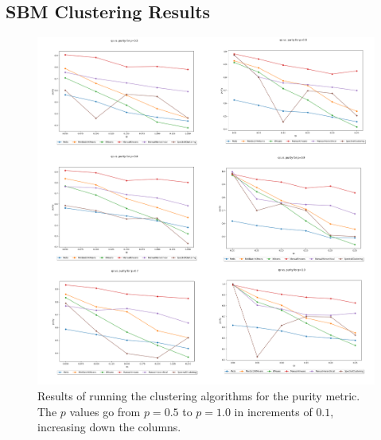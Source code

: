 \documentclass{article}
\begin{document}
\subsection{SBM Clustering Results}
\begin{figure}[H]
    \centering
    \includegraphics[width=1.15\textwidth]{results/results_purity.png}
    \caption[Clustering purity results]{Results of running the clustering algorithms for the purity metric. The $p$ values go from $p=0.5$ to $p=1.0$ in increments of $0.1$, increasing down the columns.}
    \label{fig:results_purity}
\end{figure}
\end{document}
